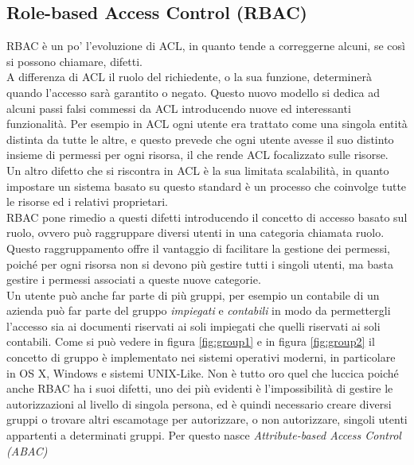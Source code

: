 \subsection*{Role-based Access Control (RBAC)} %
\label{sub:role_based_access_control}

RBAC è un po' l'evoluzione di ACL, in quanto tende a correggerne alcuni, se così si possono chiamare, difetti.\\
A differenza di ACL il ruolo del richiedente, o la sua funzione, determinerà quando l'accesso sarà garantito o negato.
Questo nuovo modello si dedica ad alcuni passi falsi commessi da ACL introducendo nuove ed interessanti funzionalità. Per esempio in ACL ogni utente era trattato come una singola entità distinta da tutte le altre, e questo prevede che ogni utente avesse il suo distinto insieme di permessi per ogni risorsa, il che rende ACL focalizzato sulle risorse.\\
Un altro difetto che si riscontra in ACL è la sua limitata scalabilità, in quanto 
impostare un sistema basato su questo standard è un processo che coinvolge tutte le risorse ed i relativi proprietari.\\
RBAC pone rimedio a questi difetti introducendo il concetto di accesso basato sul ruolo, ovvero può raggruppare diversi utenti in una categoria chiamata ruolo. 
Questo raggruppamento offre il vantaggio di facilitare la gestione dei permessi, poiché per ogni risorsa non si devono più gestire tutti i singoli utenti, ma basta gestire i permessi associati a queste nuove categorie.\\
Un utente può anche far parte di più gruppi, per esempio un contabile di un azienda può far parte del gruppo \textit{impiegati} e \textit{contabili} in modo da permettergli l'accesso sia ai documenti riservati ai soli impiegati che quelli riservati ai soli contabili.
Come si può vedere in figura \ref{fig:group1} e in figura \ref{fig:group2} il concetto di gruppo è implementato nei sistemi operativi moderni, in particolare in OS X, Windows e sistemi UNIX-Like.
Non è tutto oro quel che luccica poiché anche RBAC ha i suoi difetti, uno dei più evidenti è l'impossibilità di gestire le autorizzazioni al livello di singola persona, ed è quindi necessario creare diversi gruppi o trovare altri escamotage per autorizzare, o non autorizzare, singoli utenti appartenti a determinati gruppi. Per questo nasce \textit{Attribute-based Access Control (ABAC)}

